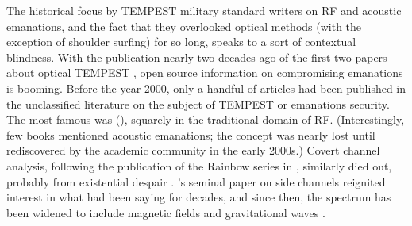 \documentclass[a4paper,twoside,11pt,openany]{book}
\begin{document}
The historical focus by TEMPEST military standard writers on RF and acoustic
emanations, and the fact that they overlooked optical methods (with the
exception of shoulder surfing) for so long, speaks to a sort of contextual
blindness. With the publication nearly two decades ago of the first two papers
about optical TEMPEST \cite{Loughry2002a,Kuhn2002}, open source information on
compromising emanations is booming. Before the year 2000, only a handful of
articles had been published in the unclassified literature on the subject of
TEMPEST or emanations security. The most famous was \citeauthor{vanEck1985}
(\citeyear{vanEck1985}), squarely in the traditional domain of RF.
(Interestingly, few books mentioned acoustic emanations; the concept was nearly
lost until rediscovered by the academic community in the early 2000s.) Covert
channel analysis, following the publication of the Rainbow series in
\citeyear{NCSC-TG-030}, similarly died out, probably from existential despair
\cite{NCSC-TG-030}. \citeauthor{Kocher1999}'s seminal paper on side channels
reignited interest in what \cite{Wright1987} had been saying for decades, and
since then, the spectrum has been widened to include magnetic fields and
gravitational waves \cite{Guri2018b,Abbott2016b}.


\end{document}
